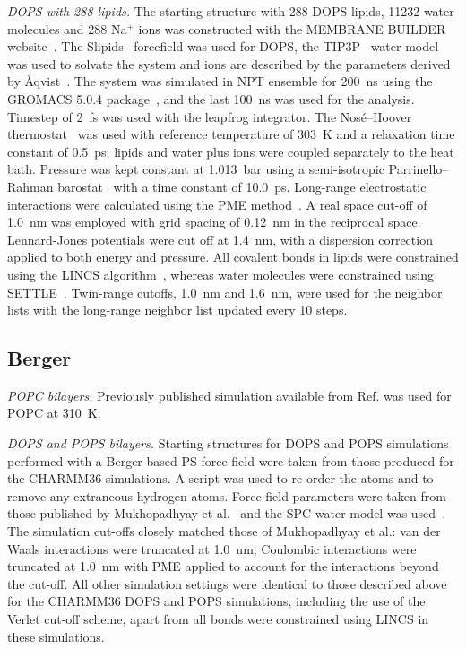 \documentclass[journal=jpcbfk,manuscript=article]{achemso}
\newcommand{\todo}[1]{\textcolor{red}{#1}}
\begin{document}
\noindent
{\it DOPS with 288 lipids.}
The starting structure with 288 DOPS lipids, 11232 water molecules and 288 Na$^+$ ions
was constructed with the MEMBRANE BUILDER website~\cite{ghahremanpour13}.
The Slipids~\cite{jambeck13} forcefield was used for DOPS, the TIP3P~\cite{jorgensen83} water model was used to solvate the system and
ions are described by the parameters derived by \AA{}qvist~\cite{aqvist90}.
The system was simulated in NPT ensemble for 200~ns using the GROMACS 5.0.4 package~\cite{abraham2015gromacs},
and the last 100~ns was used for the analysis.
Timestep of 2~fs was used with the leapfrog integrator. The Nos\'{e}--Hoover thermostat~\cite{nose84,hoover85} was used with reference temperature of 303~K and a relaxation time constant of 0.5~ps; lipids and water plus ions were coupled separately to the heat bath. Pressure was kept constant at 1.013~bar using a semi-isotropic Parrinello--Rahman
barostat~\cite{parrinello81} with a time constant of 10.0~ps. Long-range electrostatic interactions were calculated using the PME method~\cite{darden93,essman95}. A real space cut-off of 1.0~nm was employed with grid spacing of 0.12~nm in the reciprocal space. Lennard-Jones potentials were cut off at 1.4~nm, with a dispersion correction applied to both energy and pressure. All covalent bonds in lipids were constrained using the LINCS algorithm~\cite{hess97}, whereas water molecules were constrained using SETTLE~\cite{miyamoto92}. Twin-range cutoffs, 1.0~nm and 1.6~nm, were used for the neighbor lists with the long-range neighbor list updated every 10 steps.


\subsection{Berger}
\noindent
{\it POPC bilayers.} 
Previously published simulation \cite{ollila07a} available from Ref. 
was used for POPC at 310~K.

\noindent
{\it DOPS and POPS bilayers.} 
Starting structures for DOPS and POPS simulations performed with a Berger-based PS force field
were taken from those produced for the CHARMM36 simulations. A script was used to re-order the
atoms and to remove any extraneous hydrogen atoms. Force field parameters were taken from those
published by Mukhopadhyay et al.~\cite{mukhopadhyay04}
and the SPC water model was used~\cite{berendsen81}. The simulation cut-offs closely matched
those of Mukhopadhyay et al.: van der Waals interactions were truncated at 1.0~nm;
Coulombic interactions were truncated at 1.0~nm with PME applied to account for the interactions beyond the cut-off.
All other simulation settings were identical to those described above for the CHARMM36 DOPS and POPS simulations,
including the use of the Verlet cut-off scheme, apart from all bonds were constrained using LINCS in these simulations.
\end{document}
